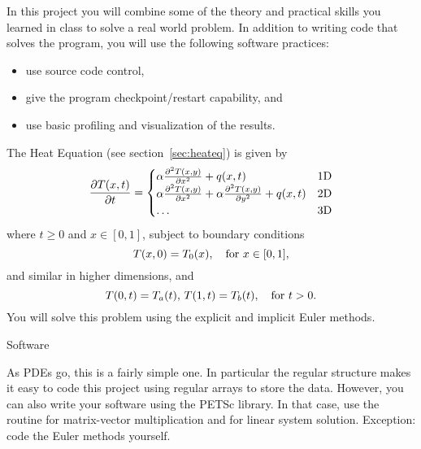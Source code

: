 
In this project you will combine some of the theory and practical
skills you learned in class to solve a real world problem. In addition
to writing code that solves the program, you will use the following
software practices:
\begin{itemize}
  \item use source code control,
  \item give the program checkpoint/restart capability, and
  \item use basic profiling and visualization of the results.
\end{itemize}

The Heat Equation (see section~\ref{sec:heateq}) is given by
\[ \frac{\partial T(x,t)}{\partial t}=
\begin{cases}
  \alpha \frac{\partial^2 T(x,y)}{\partial x^2}+q(x,t)&\hbox{1D}\\
  \alpha \frac{\partial^2 T(x,y)}{\partial x^2}+
    \alpha \frac{\partial^2 T(x,y)}{\partial y^2}+q(x,t)&\hbox{2D}\\
    \ldots&\hbox{3D}
\end{cases}
\]
where $t\geq 0$ and $x\in[0,1]$, subject to boundary conditions
\[ T(x,0)=T_0(x),\quad\hbox{for $x\in[0,1]$}, \]
and similar in higher dimensions, and
\[ T(0,t)=T_a(t),\, T(1,t)=T_b(t),\quad\hbox{for $t>0$}. \]
You will solve this problem using the explicit and implicit Euler
methods.

 {Software}

As \acp{PDE} go, this is a fairly simple one. In particular the
regular structure makes it easy to code this project using regular
arrays to store the data.
However, you can also
write your software using the PETSc library.
In that case, use the  routine
for matrix-vector multiplication and  for linear system
solution. Exception: code the Euler methods yourself.


